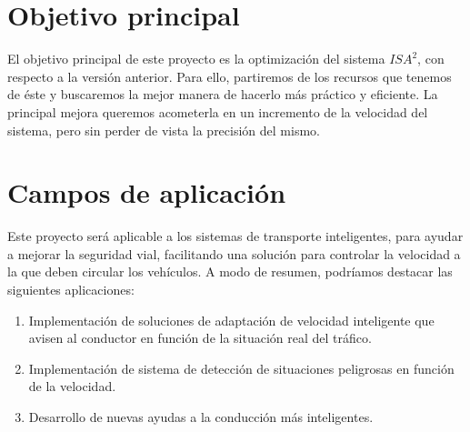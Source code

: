 



\section{Objetivo principal}


El objetivo principal de este proyecto es la optimización del sistema $ISA^{2}$, con respecto a la versión anterior. Para ello, partiremos de los recursos que tenemos de éste y buscaremos la mejor manera de hacerlo más práctico y eficiente. La principal mejora queremos acometerla en un incremento de la velocidad del sistema, pero sin perder de vista la precisión del mismo.



\section{Campos de aplicación}


Este proyecto será aplicable a los sistemas de transporte inteligentes, para ayudar a mejorar la seguridad vial, facilitando una solución para controlar la velocidad a la que deben circular los vehículos. A modo de resumen, podríamos destacar las siguientes aplicaciones:
\begin{enumerate}	
	\item Implementación de soluciones de adaptación de velocidad inteligente que avisen al conductor en función de la situación real del tráfico.
	\item Implementación de sistema de detección de situaciones peligrosas en función de la velocidad.
	\item Desarrollo de nuevas ayudas a la conducción más inteligentes.
\end{enumerate}

